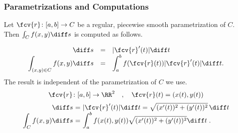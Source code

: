 \begin{frame}
\frametitle{Parametrizations and Computations}
Let $\fcv{r} \colon [a,b] \to C$ be a regular, piecewise smooth parametrization of $C$. Then $\int_C f(x,y)\diff s $ is computed as follows.

\[
\begin{array}{rcl}
\displaystyle \diff s& =&\displaystyle  | \fcv{r}'(t) | \diff t \\
\displaystyle \int_{(x,y)\in C} f(x,y)  \diff s &=&\displaystyle  \int_{a}^{b} f(\fcv{r}(t)) |\fcv{r}'(t)|  \diff t .
\end{array}
\]
The result is independent of the parametrization of $C$ we use.
\[
\fcv{r}\colon [a,b] \to \RR^2\quad , \quad \fcv{r}(t) = ( x(t), y(t) )
\]
\[
\begin{array}{r@{~}c@{~}l}
\displaystyle \diff s &=&\displaystyle  |\fcv{r}'(t)| \diff t = \sqrt{(x'(t))^2 + (y'(t))^2} \, \diff t \\
\displaystyle \int_C f(x,y)  \diff s  &=&\displaystyle  \int_{a}^{b} f(x(t),y(t))\sqrt{(x'(t))^2 + (y'(t))^2}  \diff t\; .
\end{array}
\]
\end{frame}